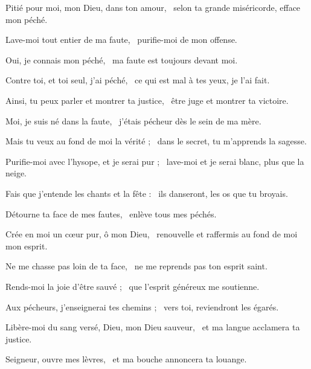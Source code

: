 \item Pitié pour moi, mon Dieu, dans ton amour,~\psstar{} selon ta grande miséricorde, efface mon péché.

\item Lave-moi tout entier de ma faute,~\psstar{} purifie-moi de mon offense.

\item Oui, je connais mon péché,~\psstar{} ma faute est toujours devant moi.

\item Contre toi, et toi seul, j'ai péché,~\psstar{} ce qui est mal à tes yeux, je l'ai fait.

\item Ainsi, tu peux parler et montrer ta justice,~\psstar{} être juge et montrer ta victoire.

\item Moi, je suis né dans la faute,~\psstar{} j'étais pécheur dès le sein de ma mère.

\item Mais tu veux au fond de moi la vérité ;~\psstar{} dans le secret, tu m'apprends la sagesse.

\item Purifie-moi avec l'hysope, et je serai pur ;~\psstar{} lave-moi et je serai blanc, plus que la neige.

\item Fais que j'entende les chants et la fête :~\psstar{} ils danseront, les os que tu broyais.

\item Détourne ta face de mes fautes,~\psstar{} enlève tous mes péchés.

\item Crée en moi un cœur pur, ô mon Dieu,~\psstar{} renouvelle et raffermis au fond de moi mon esprit.

\item Ne me chasse pas loin de ta face,~\psstar{} ne me reprends pas ton esprit saint.

\item Rends-moi la joie d'être sauvé ;~\psstar{} que l'esprit généreux me soutienne.

\item Aux pécheurs, j'enseignerai tes chemins ;~\psstar{} vers toi, reviendront les égarés.

\item Libère-moi du sang versé, Dieu, mon Dieu sauveur,~\psstar{} et ma langue acclamera ta justice.

\item Seigneur, ouvre mes lèvres,~\psstar{} et ma bouche annoncera ta louange.

